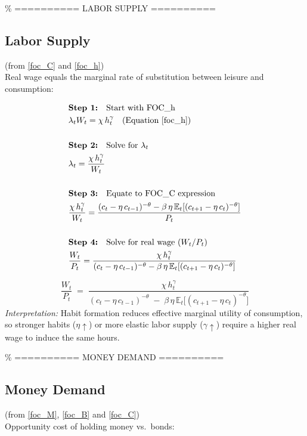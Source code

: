 \documentclass[11pt,preprint]{elsarticle}
\numberwithin{equation}{section}
\numberwithin{figure}{section}
\numberwithin{table}{section}
\begin{document}
\% ========== LABOR SUPPLY ==========

\subsection*{Labor Supply}

(from \eqref{foc_C} and \eqref{foc_h})\\
Real wage equals the marginal rate of substitution between leisure and
consumption:

\begin{align*}
& \textbf{Step 1:} \quad \text{Start with FOC\_h} \\
& \lambda_t W_t = \chi\,h_t^{\gamma} \quad \text{(Equation \ref{foc_h})} \\
& \\
& \textbf{Step 2:} \quad \text{Solve for } \lambda_t \\
& \lambda_t = \frac{\chi\,h_t^{\gamma}}{W_t} \\
& \\
& \textbf{Step 3:} \quad \text{Equate to FOC\_C expression} \\
& \frac{\chi\,h_t^{\gamma}}{W_t} = \frac{(c_t - \eta\,c_{t-1})^{-\theta} - \beta\,\eta\,\mathbb{E}_t[(c_{t+1} - \eta\,c_t)^{-\theta}]}{P_t} \\
& \\
& \textbf{Step 4:} \quad \text{Solve for real wage } (W_t/P_t) \\
& \frac{W_t}{P_t} = \frac{\chi\,h_t^{\gamma}}{(c_t - \eta\,c_{t-1})^{-\theta} - \beta\,\eta\,\mathbb{E}_t[(c_{t+1} - \eta\,c_t)^{-\theta}]}
\end{align*}

\[
\boxed{
  \frac{W_t}{P_t}
  \;=\;
  \frac{\chi\,h_t^{\gamma}}
       {(c_t - \eta\,c_{t-1})^{-\theta}
        \;-\;
        \beta\,\eta\,\mathbb{E}_t\!\bigl[(c_{t+1} - \eta\,c_t)^{-\theta}\bigr]}
}
\] \textit{Interpretation:} Habit formation reduces effective marginal
utility of consumption, so stronger habits (\(\eta\uparrow\)) or more
elastic labor supply (\(\gamma\uparrow\)) require a higher real wage to
induce the same hours.

\% ========== MONEY DEMAND ==========

\subsection*{Money Demand}

(from \eqref{foc_M}, \eqref{foc_B} and \eqref{foc_C})\\
Opportunity cost of holding money vs.~bonds:
\end{document}

